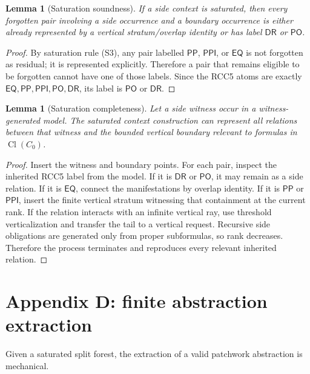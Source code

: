 \documentclass[11pt]{article}
\newtheorem{lemma}[theorem]{Lemma}
\newcommand{\EQ}{\mathsf{EQ}}
\newcommand{\PP}{\mathsf{PP}}
\newcommand{\PPI}{\mathsf{PPI}}
\newcommand{\PO}{\mathsf{PO}}
\newcommand{\DR}{\mathsf{DR}}
\newcommand{\Cl}{\operatorname{Cl}}
\begin{document}
\begin{lemma}[Saturation soundness]
If a side context is saturated, then every forgotten pair involving a side occurrence and a boundary occurrence is either already represented by a vertical stratum/overlap identity or has label $\DR$ or $\PO$.
\end{lemma}

\begin{proof}
By saturation rule (S3), any pair labelled $\PP$, $\PPI$, or $\EQ$ is not forgotten as residual; it is represented explicitly.  Therefore a pair that remains eligible to be forgotten cannot have one of those labels.  Since the RCC5 atoms are exactly $\EQ,\PP,\PPI,\PO,\DR$, its label is $\PO$ or $\DR$.
\end{proof}

\begin{lemma}[Saturation completeness]
Let a side witness occur in a witness-generated model.  The saturated context construction can represent all relations between that witness and the bounded vertical boundary relevant to formulas in $\Cl(C_0)$.
\end{lemma}

\begin{proof}
Insert the witness and boundary points.  For each pair, inspect the inherited RCC5 label from the model.  If it is $\DR$ or $\PO$, it may remain as a side relation.  If it is $\EQ$, connect the manifestations by overlap identity.  If it is $\PP$ or $\PPI$, insert the finite vertical stratum witnessing that containment at the current rank.  If the relation interacts with an infinite vertical ray, use threshold verticalization and transfer the tail to a vertical request.  Recursive side obligations are generated only from proper subformulas, so rank decreases.  Therefore the process terminates and reproduces every relevant inherited relation.
\end{proof}

\section{Appendix D: finite abstraction extraction}

Given a saturated split forest, the extraction of a valid patchwork abstraction is mechanical.
\end{document}

